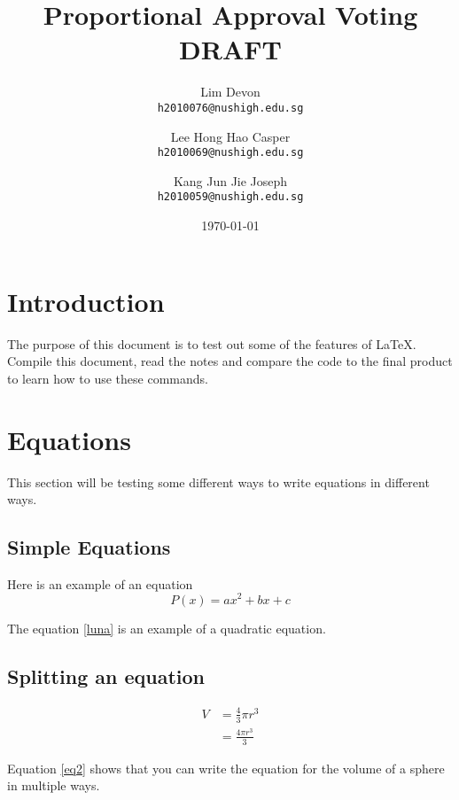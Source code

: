 \documentclass{article}
\title{Proportional Approval Voting\\DRAFT}
\author{
  Lim Devon\\
  \texttt{h2010076@nushigh.edu.sg}
  \and
  Lee Hong Hao Casper\\
  \texttt{h2010069@nushigh.edu.sg}
  \and
  Kang Jun Jie Joseph\\
  \texttt{h2010059@nushigh.edu.sg}
}
\date{\today}
\begin{document}
\maketitle

\section{Introduction}
The purpose of this document is to test out some of the features of \LaTeX{}. Compile this document, read the notes and compare the code to the final product to learn how to use these commands.

\section{Equations}
This section will be testing some different ways to write equations in different ways. 

\subsection{Simple Equations}
Here is an example of an equation
\begin{equation} \label{luna}
P(x)=ax^2+bx+c
\end{equation}

The equation \ref{luna} is an example of a quadratic equation.

\subsection{Splitting an equation}

\begin{equation}\label{eq2}
\begin{split}
V&=\frac{4}{3}\pi r^3 \\
&= \frac{4\pi r^3}{3}
\end{split}
\end{equation}

Equation \ref{eq2} shows that you can write the equation for the volume of a sphere in multiple ways.
\end{document}

